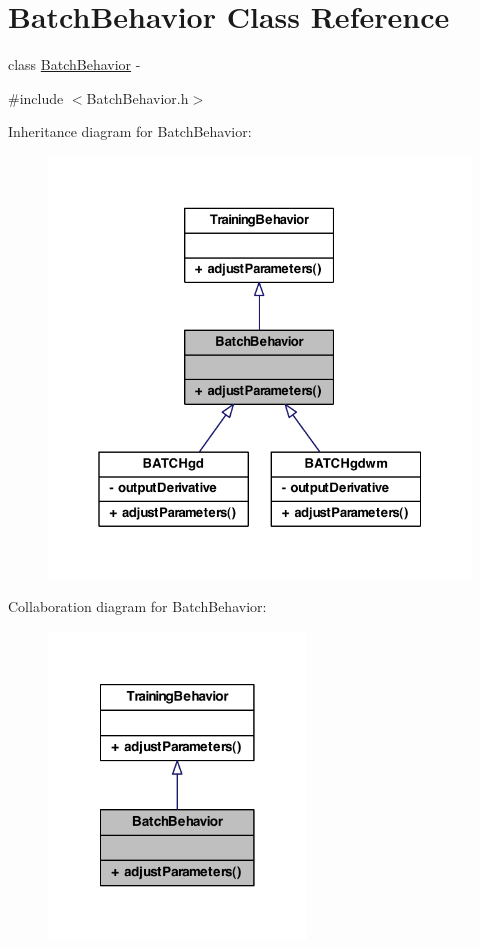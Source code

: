 \hypertarget{class_batch_behavior}{
\section{BatchBehavior Class Reference}
\label{class_batch_behavior}
}


class \hyperlink{class_batch_behavior}{BatchBehavior} -\/  




{\ttfamily \#include $<$BatchBehavior.h$>$}



Inheritance diagram for BatchBehavior:\nopagebreak
\begin{figure}[H]
\begin{center}
\leavevmode
\includegraphics[width=327pt]{class_batch_behavior__inherit__graph}
\end{center}
\end{figure}


Collaboration diagram for BatchBehavior:\nopagebreak
\begin{figure}[H]
\begin{center}
\leavevmode
\includegraphics[width=194pt]{class_batch_behavior__coll__graph}
\end{center}
\end{figure}
